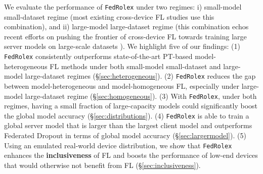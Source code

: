\documentclass{article}
\begin{document}
We evaluate the performance of \texttt{FedRolex} under two regimes: i) small-model small-dataset regime (most existing cross-device FL studies use this combination), and ii) large-model large-dataset regime (this combination echos recent efforts on pushing the frontier of cross-device FL towards training large server models on large-scale datasets \cite{ro2022scaling, zachary2022federatedselect, wang2020attack, yang2022partial}).
%
%
We highlight five of our findings:
(1) \texttt{FedRolex} consistently outperforms state-of-the-art PT-based model-heterogeneous FL methods under both small-model small-dataset and large-model large-dataset regimes (\S\ref{sec:heterogeneous}). 
%
(2) \texttt{FedRolex} reduces the gap between model-heterogeneous and model-homogeneous FL, especially under large-model large-dataset regime (\S\ref{sec:homogeneous}).
%
(3) With \texttt{FedRolex}, under both regimes, having a small fraction of large-capacity models could significantly boost the global model accuracy (\S\ref{sec:distributions}).
%
(4) \texttt{FedRolex} is able to train a global server model that is larger than the largest client model and outperforms Federated Dropout in terms of global model accuracy (\S\ref{sec:largermodel}).
%
(5) Using an emulated real-world device distribution, we show that \texttt{FedRolex} enhances the \textbf{inclusiveness} of FL and boosts the performance of low-end devices that would otherwise not benefit from FL (\S\ref{sec:inclusiveness}).
\end{document}
